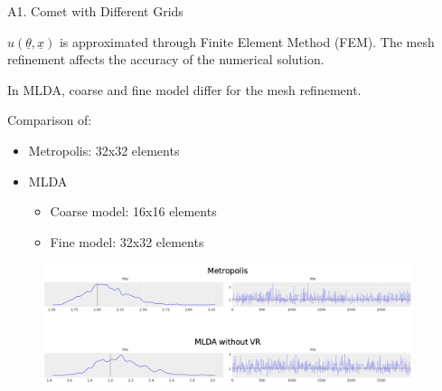 \documentclass[10pt, a4paper]{beamer}
\begin{document}
	\begin{frame}{A1. Comet with Different Grids}
		
		\vspace{0.5\baselineskip}
		
		$u(\underline{\theta}, \underline{x})$ is approximated through Finite Element Method (FEM). The mesh refinement affects the accuracy of the numerical solution.
		
		\vspace{0.5\baselineskip}
		
		In MLDA, coarse and fine model differ for the mesh refinement.
		
		\vspace{0.5\baselineskip}
		
		Comparison of:
		
		\begin{itemize}
			
			\item Metropolis: 32x32 elements
			
			\item MLDA
			
			\begin{itemize}
				
				\item Coarse model: 16x16 elements
				
				\item Fine model: \hspace{2mm} 32x32 elements
				
			\end{itemize}
			
		\end{itemize}
		
		\begin{figure}[H]
			
			\includegraphics[height= 3.5cm, keepaspectratio]{A1_Metropolis_MLDA}
			
		\end{figure}
		
	\end{frame}
\end{document}
